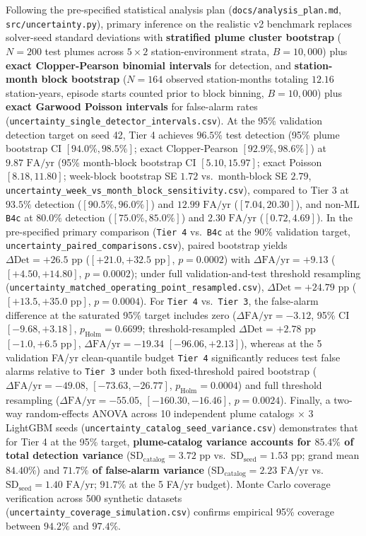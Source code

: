 \documentclass[11pt,a4paper]{article}
\begin{document}
\begin{framed}
Following the pre-specified statistical analysis plan (\texttt{docs/analysis\_plan.md}, \texttt{src/uncertainty.py}), primary inference on the realistic v2 benchmark replaces solver-seed standard deviations with \textbf{stratified plume cluster bootstrap} ($N=200$ test plumes across $5 \times 2$ station-environment strata, $B=10{,}000$) plus \textbf{exact Clopper-Pearson binomial intervals} for detection, and \textbf{station-month block bootstrap} ($N=164$ observed station-months totaling $12.16$ station-years, episode starts counted prior to block binning, $B=10{,}000$) plus \textbf{exact Garwood Poisson intervals} for false-alarm rates (\texttt{uncertainty\_single\_detector\_intervals.csv}). At the 95\% validation detection target on seed 42, Tier 4 achieves $96.5\%$ test detection (95\% plume bootstrap CI $[94.0\%, 98.5\%]$; exact Clopper-Pearson $[92.9\%, 98.6\%]$) at $9.87\text{ FA/yr}$ (95\% month-block bootstrap CI $[5.10, 15.97]$; exact Poisson $[8.18, 11.80]$; week-block bootstrap SE $1.72$ vs.\ month-block SE $2.79$, \texttt{uncertainty\_week\_vs\_month\_block\_sensitivity.csv}), compared to Tier 3 at $93.5\%$ detection ($[90.5\%, 96.0\%]$) and $12.99\text{ FA/yr}$ ($[7.04, 20.30]$), and non-ML \texttt{B4c} at $80.0\%$ detection ($[75.0\%, 85.0\%]$) and $2.30\text{ FA/yr}$ ($[0.72, 4.69]$). In the pre-specified primary comparison (\texttt{Tier 4} vs.\ \texttt{B4c} at the 90\% validation target, \texttt{uncertainty\_paired\_comparisons.csv}), paired bootstrap yields $\Delta\text{Det} = +26.5\text{ pp}$ ($[+21.0, +32.5\text{ pp}]$, $p = 0.0002$) with $\Delta\text{FA/yr} = +9.13$ ($[+4.50, +14.80]$, $p = 0.0002$); under full validation-and-test threshold resampling (\texttt{uncertainty\_matched\_operating\_point\_resampled.csv}), $\Delta\text{Det} = +24.79\text{ pp}$ ($[+13.5, +35.0\text{ pp}]$, $p = 0.0004$). For \texttt{Tier 4} vs.\ \texttt{Tier 3}, the false-alarm difference at the saturated 95\% target includes zero ($\Delta\text{FA/yr} = -3.12$, 95\% CI $[-9.68, +3.18]$, $p_{\text{Holm}} = 0.6699$; threshold-resampled $\Delta\text{Det} = +2.78\text{ pp}$ $[-1.0, +6.5\text{ pp}]$, $\Delta\text{FA/yr} = -19.34$ $[-96.06, +2.13]$), whereas at the 5 validation FA/yr clean-quantile budget \texttt{Tier 4} significantly reduces test false alarms relative to \texttt{Tier 3} under both fixed-threshold paired bootstrap ($\Delta\text{FA/yr} = -49.08$, $[-73.63, -26.77]$, $p_{\text{Holm}} = 0.0004$) and full threshold resampling ($\Delta\text{FA/yr} = -55.05$, $[-160.30, -16.46]$, $p = 0.0024$). Finally, a two-way random-effects ANOVA across 10 independent plume catalogs $\times$ 3 LightGBM seeds (\texttt{uncertainty\_catalog\_seed\_variance.csv}) demonstrates that for Tier 4 at the 95\% target, \textbf{plume-catalog variance accounts for $85.4\%$ of total detection variance} ($\text{SD}_{\text{catalog}} = 3.72\text{ pp}$ vs.\ $\text{SD}_{\text{seed}} = 1.53\text{ pp}$; grand mean $84.40\%$) and \textbf{$71.7\%$ of false-alarm variance} ($\text{SD}_{\text{catalog}} = 2.23\text{ FA/yr}$ vs.\ $\text{SD}_{\text{seed}} = 1.40\text{ FA/yr}$; $91.7\%$ at the 5 FA/yr budget). Monte Carlo coverage verification across 500 synthetic datasets (\texttt{uncertainty\_coverage\_simulation.csv}) confirms empirical 95\% coverage between $94.2\%$ and $97.4\%$.


\end{framed}
\end{document}
